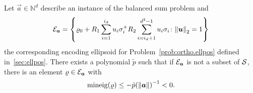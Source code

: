 \begin{lemma}\label{lem:bayesian.positivity_violation}
  Let $\vec a \in \mathbb{N}^d$ describe an instance of the balanced sum problem and
  \begin{equation}
    \label{eq:bayesian.positivity_violation.ellipsoid}
    \mathcal{E}_{{\boldsymbol{a}}} = \left\{ \varrho_0 + R_1 \sum_{i=1}^{i_d} u_i \sigma_i^ + R_2 \sum_{i=i_d + 1}^{d^2 - 1} u_i \sigma_i \colon {\Vert{\boldsymbol{u}}\Vert}_2 = 1 \right\}
  \end{equation}
  the corresponding encoding ellipsoid for Problem~\ref{prob:ortho.ellpos} defined in~\ref{sec:ellpos}.
  There exists a polynomial $\tilde p$ such that if $\mathcal{E}_{{\boldsymbol{a}}}$ is not a subset of $\mathcal{S}$, there is an element $\varrho \in \mathcal{E}_{{\boldsymbol{a}}}$ with
  \begin{equation}
    \mathrm{mineig}(\varrho) \le -\tilde p{({\Vert{\boldsymbol{a}}\Vert})}^{-1} < 0.
  \end{equation}
\end{lemma}
